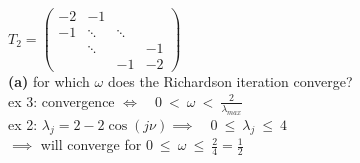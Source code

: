 \begin{SolutionSheet}[\ref{sheet6}]
\begin{onehalfspace}
  \begin{Solution} $T_2 = \begin{pmatrix}
    -2 & -1 & & \\
    -1 & \ddots & \ddots & \\
    & \ddots && -1 \\
    && -1 & -2
  \end{pmatrix} $\\
  \textbf{(a)} for which $\omega$ does the Richardson iteration converge? \\
  ex 3: convergence $\iff \quad 0 \ < \ \omega \ < \ \frac{2}{\lambda_{max}}$ \\
  ex 2: $\lambda_j = 2-2\cos(j\nu) \implies \quad 0 \ \leq \ \lambda_j \ \leq \ 4$ \\
  $\implies$ will converge for $0 \ \leq \ \omega \ \leq \ \frac{2}{4} = \frac{1}{2}$ 
  \end{Solution}

\end{onehalfspace}
\end{SolutionSheet}


